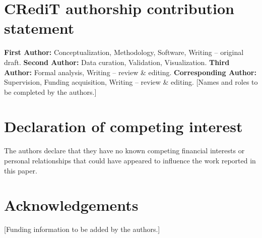 \section*{CRediT authorship contribution statement}
\textbf{First Author:} Conceptualization, Methodology, Software, Writing -- original draft.
\textbf{Second Author:} Data curation, Validation, Visualization.
\textbf{Third Author:} Formal analysis, Writing -- review \& editing.
\textbf{Corresponding Author:} Supervision, Funding acquisition, Writing -- review \& editing.
[Names and roles to be completed by the authors.]

\section*{Declaration of competing interest}
The authors declare that they have no known competing financial interests or personal relationships that could have
appeared to influence the work reported in this paper.

\section*{Acknowledgements}
[Funding information to be added by the authors.]
